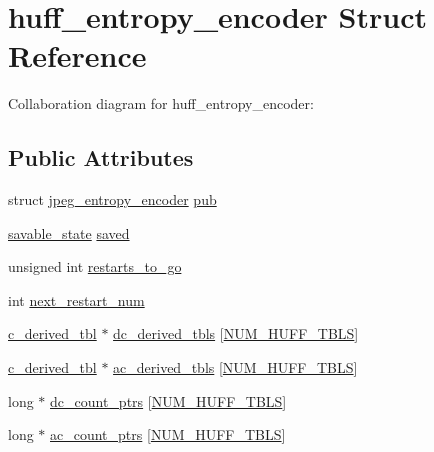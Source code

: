 \hypertarget{structhuff__entropy__encoder}{}\section{huff\+\_\+entropy\+\_\+encoder Struct Reference}
\label{structhuff__entropy__encoder}


Collaboration diagram for huff\+\_\+entropy\+\_\+encoder\+:
\subsection*{Public Attributes}
\begin{DoxyCompactItemize}
\item 
struct \hyperlink{structjpeg__entropy__encoder}{jpeg\+\_\+entropy\+\_\+encoder} \hyperlink{structhuff__entropy__encoder_a1a7606509ffbd9efd4c611af433879e0}{pub}
\item 
\hyperlink{structsavable__state}{savable\+\_\+state} \hyperlink{structhuff__entropy__encoder_ac27e136d5c3baca34bafde2053d91ad0}{saved}
\item 
unsigned int \hyperlink{structhuff__entropy__encoder_a6c999079a14022f2610081d420c36513}{restarts\+\_\+to\+\_\+go}
\item 
int \hyperlink{structhuff__entropy__encoder_ad6a426b0d41e9d06359bcc57481c891b}{next\+\_\+restart\+\_\+num}
\item 
\hyperlink{structc__derived__tbl}{c\+\_\+derived\+\_\+tbl} $\ast$ \hyperlink{structhuff__entropy__encoder_a6264cf74944972824cea6639229bdebe}{dc\+\_\+derived\+\_\+tbls} \mbox{[}\hyperlink{jpeglib_8h_a6b12985705944e0623b671f29dc5722e}{N\+U\+M\+\_\+\+H\+U\+F\+F\+\_\+\+T\+B\+L\+S}\mbox{]}
\item 
\hyperlink{structc__derived__tbl}{c\+\_\+derived\+\_\+tbl} $\ast$ \hyperlink{structhuff__entropy__encoder_a0b67beb3a73da24b5d09693f3c0c8b22}{ac\+\_\+derived\+\_\+tbls} \mbox{[}\hyperlink{jpeglib_8h_a6b12985705944e0623b671f29dc5722e}{N\+U\+M\+\_\+\+H\+U\+F\+F\+\_\+\+T\+B\+L\+S}\mbox{]}
\item 
long $\ast$ \hyperlink{structhuff__entropy__encoder_aee66f11440e615c95b333d71d3613513}{dc\+\_\+count\+\_\+ptrs} \mbox{[}\hyperlink{jpeglib_8h_a6b12985705944e0623b671f29dc5722e}{N\+U\+M\+\_\+\+H\+U\+F\+F\+\_\+\+T\+B\+L\+S}\mbox{]}
\item 
long $\ast$ \hyperlink{structhuff__entropy__encoder_acc141b7e17ee817d92b9340d603dde9e}{ac\+\_\+count\+\_\+ptrs} \mbox{[}\hyperlink{jpeglib_8h_a6b12985705944e0623b671f29dc5722e}{N\+U\+M\+\_\+\+H\+U\+F\+F\+\_\+\+T\+B\+L\+S}\mbox{]}

\end{DoxyCompactItemize}
